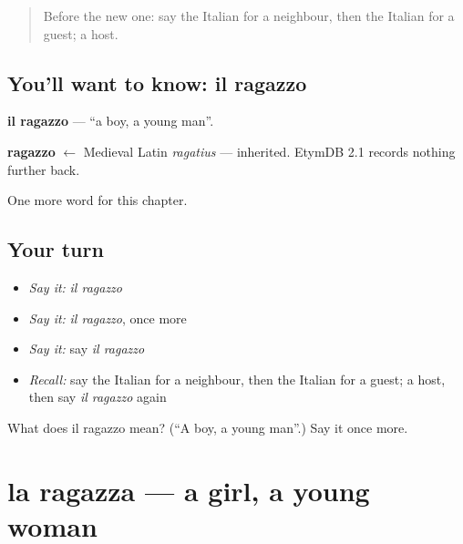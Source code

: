 \label{lesson:IT-C46-ragazzo}



\begin{quote}
Before the new one: say the Italian for a neighbour, then the Italian for a guest; a host.
\end{quote}

\subsection*{You'll want to know: il ragazzo}
\textbf{il ragazzo} — \textquotedblleft{}a boy, a young man\textquotedblright{}.

\begin{cousinweb}
\textbf{ragazzo} $\leftarrow$ Medieval Latin \emph{ragatius} — inherited. EtymDB 2.1 records nothing further back.
\end{cousinweb}

\begin{grammarlens}[title={What you've built}]
One more word for this chapter.
\end{grammarlens}

\subsection*{Your turn}
\begin{itemize}
\raggedright
  \item \emph{Say it:} \emph{il ragazzo}
  \item \emph{Say it:} \emph{il ragazzo}, once more
  \item \emph{Say it:} say \emph{il ragazzo}
  \item \emph{Recall:} say the Italian for a neighbour, then the Italian for a guest; a host, then say \emph{il ragazzo} again
\end{itemize}

\begin{tcolorbox}[breakable,colback=teal!4,colframe=teal!35!black,title={Before you move on}]
What does il ragazzo mean? (\textquotedblleft{}A boy, a young man\textquotedblright{}.) Say it once more.
\end{tcolorbox}
\section[la ragazza]{la ragazza — a girl, a young woman}

\label{lesson:IT-C46-ragazza}



